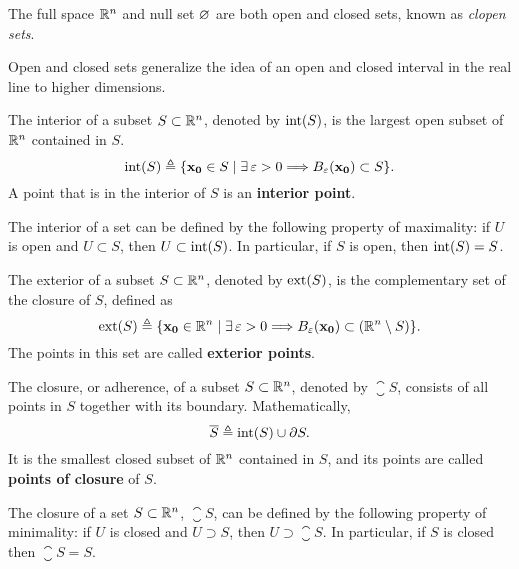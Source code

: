 \begin{prop}
    The full space $\Rtn$ and null set $\O$ are both open and closed sets, known as \textit{clopen sets}.
\end{prop}

Open and closed sets generalize the idea of an open and closed interval in the real line to higher dimensions.

\begin{defn}[Interior]
	The interior of a subset $S\subset\Rtn$, denoted by $\interior{S}$, is the largest open subset of $\Rtn$ contained in $S$. 
	\begin{equation}
		\interior{S}\bydef\{\vec{x_0}\in S\st\exists\epsilon > 0\implies B_\epsilon\argopen(\vec{x_0}\argclose)\subset S\}.
	\end{equation}
        A point that is in the interior of $S$ is an \textbf{interior point}.
\end{defn}

\begin{note}
    The interior of a set can be defined by the following property of maximality: if $U$ is open and $U\subset S$, then
    $U\subset\interior{S}$. In particular, if $S$ is open, then $\interior{S} = S$.
\end{note}

\begin{defn}[Exterior]
	The exterior of a subset $S\subset\Rtn$, denoted by $\exterior{S}$, is the complementary set of the closure of $S$, defined as
	\begin{equation}
		\exterior{S}\bydef\{\vec{x_0}\in\Rtn\st\exists\epsilon > 0\implies B_\epsilon\argopen(\vec{x_0}\argclose)\subset
		\left(\Rtn\setminus S\right)\}.
	\end{equation}
	The points in this set are called \textbf{exterior points}.
\end{defn}

\begin{defn}[Closure]
    The closure, or adherence, of a subset $S\subset\Rtn$, denoted by $\closure{S}$, consists of all points in $S$ 
    together with its boundary. Mathematically, 
    \begin{equation}
        \closure{S}\bydef\interior{S}\cup\frontier{S}.
    \end{equation}
    It is the smallest closed subset of $\Rtn$ contained in $S$, and its points are called \textbf{points of closure} of $S$.
\end{defn}

\begin{note}
    The closure of a set $S\subset\Rtn$, $\closure{S}$, can be defined by the following property of minimality: if $U$ is
    closed and $U\supset S$, then $U\supset\closure{S}$. In particular, if $S$ is closed then $\closure{S} = S$.
\end{note}

